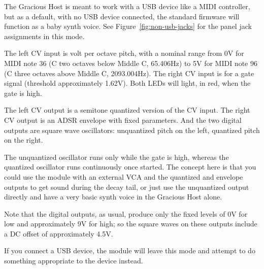 The Gracious Host is meant to work with a USB device like a MIDI controller,
but as a default, with no USB device connected, the standard firmware will
function as a baby synth voice.  See Figure~\ref{fig:non-usb-jacks} for the
panel jack assignments in this mode.

The left CV input is volt per octave pitch, with a nominal range from 0V for
MIDI note 36 (C two octaves below Middle C, 65.406Hz) to 5V for MIDI note
96 (C three octaves above Middle C, 2093.004Hz).  The right CV input is for
a gate signal (threshold approximately 1.62V).  Both LEDs will light, in red,
when the gate is high.

The left CV output is a semitone quantized version of the CV input.  The
right CV output is an ADSR envelope with fixed parameters.  And the two
digital outputs are square wave oscillators:  unquantized pitch on the left,
quantized pitch on the right.

\newpage

The unquantized oscillator runs only while
the gate is high, whereas the quantized oscillator runs continuously once
started.  The concept here is that you could use the module with an external
VCA and the quantized and envelope outputs to get sound during the decay tail, or just
use the unquantized output directly and have a very basic synth voice in the
Gracious Host alone.

Note that the digital outputs, as usual, produce only the fixed levels of 0V
for low and approximately 9V for high; so the square waves on these outputs
include a DC offset of approximately 4.5V.

If you connect a USB device, the module will leave this mode and attempt to
do something appropriate to the device instead.
